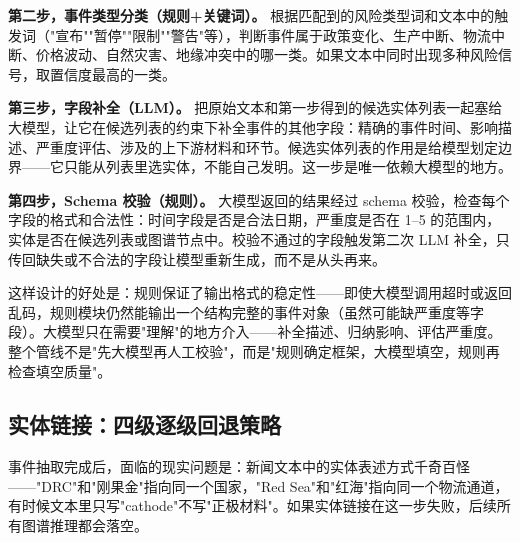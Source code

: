 \documentclass[12pt,a4paper]{ctexart}
\begin{document}
\textbf{第二步，事件类型分类（规则+关键词）。} 根据匹配到的风险类型词和文本中的触发词（"宣布""暂停""限制""警告"等），判断事件属于政策变化、生产中断、物流中断、价格波动、自然灾害、地缘冲突中的哪一类。如果文本中同时出现多种风险信号，取置信度最高的一类。

\textbf{第三步，字段补全（LLM）。} 把原始文本和第一步得到的候选实体列表一起塞给大模型，让它在候选列表的约束下补全事件的其他字段：精确的事件时间、影响描述、严重度评估、涉及的上下游材料和环节。候选实体列表的作用是给模型划定边界——它只能从列表里选实体，不能自己发明。这一步是唯一依赖大模型的地方。

\textbf{第四步，Schema 校验（规则）。} 大模型返回的结果经过 schema 校验，检查每个字段的格式和合法性：时间字段是否是合法日期，严重度是否在 1--5 的范围内，实体是否在候选列表或图谱节点中。校验不通过的字段触发第二次 LLM 补全，只传回缺失或不合法的字段让模型重新生成，而不是从头再来。

\begin{center}
\end{center}

这样设计的好处是：规则保证了输出格式的稳定性——即使大模型调用超时或返回乱码，规则模块仍然能输出一个结构完整的事件对象（虽然可能缺严重度等字段）。大模型只在需要"理解"的地方介入——补全描述、归纳影响、评估严重度。整个管线不是"先大模型再人工校验"，而是"规则确定框架，大模型填空，规则再检查填空质量"。

\subsection{实体链接：四级逐级回退策略}

事件抽取完成后，面临的现实问题是：新闻文本中的实体表述方式千奇百怪——"DRC"和"刚果金"指向同一个国家，"Red Sea"和"红海"指向同一个物流通道，有时候文本里只写"cathode"不写"正极材料"。如果实体链接在这一步失败，后续所有图谱推理都会落空。
\end{document}
